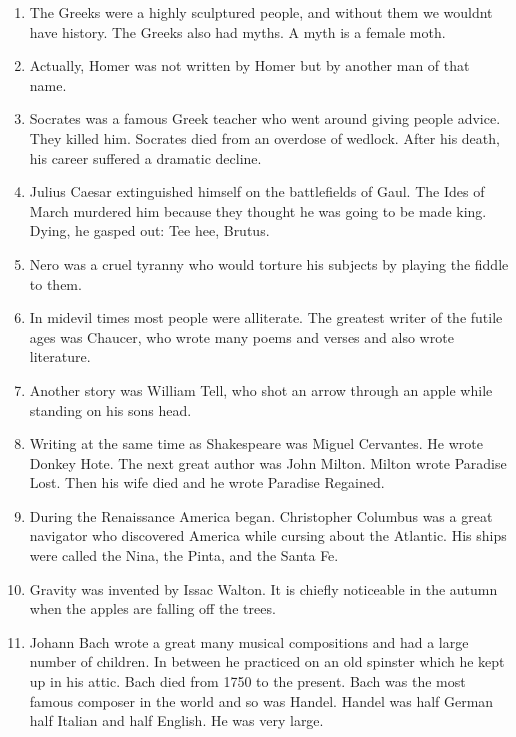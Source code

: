 \begin{enumerate}

\item
The Greeks were a highly sculptured people, and without
them we wouldnt have history. The Greeks also had myths.
A myth is a female moth.

\item
Actually, Homer was not written by Homer but by another
man of that name.

\item
Socrates was a famous Greek teacher who went around
giving people advice. They killed him. Socrates died from an
overdose of wedlock. After his death, his career suffered a
dramatic decline.

\item
Julius Caesar extinguished himself on the battlefields
of Gaul. The Ides of March murdered him because they thought
he was going to be made king. Dying, he gasped out: Tee hee,
Brutus.

\item
Nero was a cruel tyranny who would torture his subjects
by playing the fiddle to them.

\item
In midevil times most people were alliterate. The
greatest writer of the futile ages was Chaucer, who
wrote many poems and verses and also wrote literature.

\item
Another story was William Tell, who shot an arrow
through an apple while standing on his sons head.

\item
Writing at the same time as Shakespeare was Miguel
Cervantes. He wrote Donkey Hote. The next great author
was John Milton. Milton wrote Paradise Lost. Then his
wife died and he wrote Paradise Regained.

\item
During the Renaissance America began. Christopher
Columbus was a great navigator who discovered America while
cursing about the Atlantic. His ships were called the Nina,
the Pinta, and the Santa Fe.

\item
Gravity was invented by Issac Walton. It is chiefly
noticeable in the autumn when the apples are falling
off the trees.

\item
Johann Bach wrote a great many musical compositions and
had a large number of children. In between he practiced on
an old spinster which he kept up in his attic. Bach died
from 1750 to the present. Bach was the most famous composer
in the world and so was Handel. Handel was half German
half Italian and half English. He was very large.


\end{enumerate}
